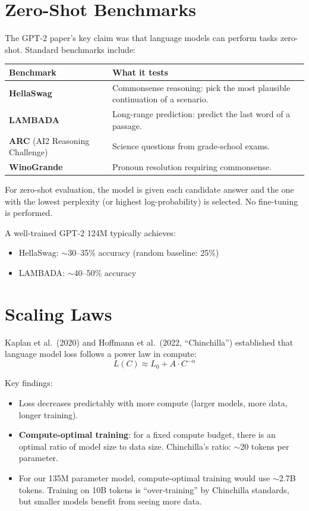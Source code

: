 \section{Zero-Shot Benchmarks}

The GPT-2 paper's key claim was that language models can perform tasks zero-shot.  Standard benchmarks include:

\begin{center}
\begin{tabular}{lp{8cm}}
\toprule
Benchmark & What it tests \\
\midrule
\textbf{HellaSwag} & Commonsense reasoning: pick the most plausible continuation of a scenario. \\
\textbf{LAMBADA} & Long-range prediction: predict the last word of a passage. \\
\textbf{ARC} (AI2 Reasoning Challenge) & Science questions from grade-school exams. \\
\textbf{WinoGrande} & Pronoun resolution requiring commonsense. \\
\bottomrule
\end{tabular}
\end{center}

For zero-shot evaluation, the model is given each candidate answer and the one with the lowest perplexity (or highest log-probability) is selected.  No fine-tuning is performed.

A well-trained GPT-2 124M typically achieves:
\begin{itemize}
  \item HellaSwag: $\sim$30--35\% accuracy (random baseline: 25\%)
  \item LAMBADA: $\sim$40--50\% accuracy
\end{itemize}


\section{Scaling Laws}

Kaplan et al.\ (2020) and Hoffmann et al.\ (2022, ``Chinchilla'') established that language model loss follows a power law in compute:
\[
  L(C) \approx L_0 + A \cdot C^{-\alpha}
\]

Key findings:
\begin{itemize}
  \item Loss decreases predictably with more compute (larger models, more data, longer training).
  \item \textbf{Compute-optimal training}: for a fixed compute budget, there is an optimal ratio of model size to data size.  Chinchilla's ratio: $\sim$20 tokens per parameter.
  \item For our 135M parameter model, compute-optimal training would use $\sim$2.7B tokens.  Training on 10B tokens is ``over-training'' by Chinchilla standards, but smaller models benefit from seeing more data.
\end{itemize}

